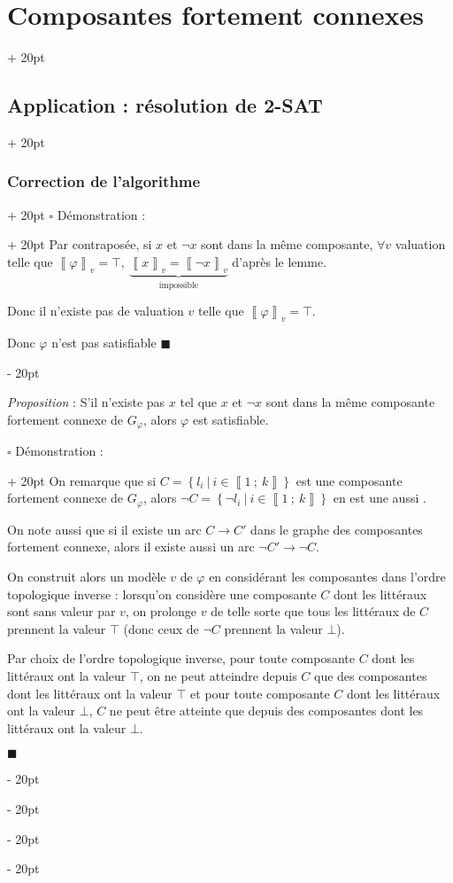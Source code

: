 \documentclass[a4paper, 12pt, twoside]{article}
\newcommand{\nset}[2]{\left\llbracket #1\ ;\ #2 \right\rrbracket}
\newcommand{\lrbb}[1]{\left\llbracket #1 \right\rrbracket}
\newcommand{\set}[1]{\left\{ #1 \right\}}
\newcommand{\ind}[1][20pt]{\advance\leftskip + #1}
\newcommand{\deind}[1][20pt]{\advance\leftskip - #1}
\newenvironment{indt}[2][20pt]{#2 \par \ind[#1]}{\par \deind} %
\newenvironment{proof}[1][{Démonstration :}]{\begin{indt}{$\square$ #1}}{$\blacksquare$ \end{indt}}
\begin{document}
\begin{indt}{\section{Composantes fortement connexes}}
\begin{indt}{\subsection{Application : résolution de 2-SAT}}
\begin{indt}{\subsubsection{Correction de l'algorithme}}
                \begin{proof}
                    Par contraposée, si $x$ et $\neg x$ sont dans la même composante, $\forall v$ valuation telle que $\lrbb \varphi _v = \top,\ \underbrace{\lrbb{x}_v = \lrbb{\neg x}_v}_{\text{impossible}}$ d'après le lemme.

                    Donc il n'existe pas de valuation $v$ telle que $\lrbb \varphi _v = \top$.

                    Donc $\varphi$ n'est pas satisfiable
                \end{proof}

                \vspace{12pt}
                
                \begin{pseudocode}
                    \textit{Proposition} :
                    S'il n'existe pas $x$ tel que $x$ et $\neg x$ sont dans la même composante fortement connexe de $G_\varphi$, alors $\varphi$ est satisfiable.
                \end{pseudocode}

                \begin{proof}
                    On remarque que si $C = \set{l_i\ |\ i \in \nset 1 k}$ est une composante fortement connexe de $G_\varphi$, alors $\neg C = \set{\neg l_i\ |\ i \in \nset 1 k}$ en est une aussi .

                    On note aussi que si il existe un arc $C \rightarrow C'$ dans le graphe des composantes fortement connexe, alors il existe aussi un arc $\neg C' \rightarrow \neg C$.

                    \vspace{12pt}
                    
                    On construit alors un modèle $v$ de $\varphi$ en considérant les composantes dans l'ordre topologique inverse : lorsqu'on considère une composante $C$ dont les littéraux sont sans valeur par $v$, on prolonge $v$ de telle sorte que tous les littéraux de $C$ prennent la valeur $\top$ (donc ceux de $\neg C$ prennent la valeur $\bot$).

                    \vspace{12pt}
                    
                    Par choix de l'ordre topologique inverse, pour toute composante $C$ dont les littéraux ont la valeur $\top$, on ne peut atteindre depuis $C$ que des composantes dont les littéraux ont la valeur $\top$ et pour toute composante $C$ dont les littéraux ont la valeur $\bot$, $C$ ne peut être atteinte que depuis des composantes dont les littéraux ont la valeur $\bot$.


\end{proof}
\end{indt}
\end{indt}
\end{indt}
\end{document}
